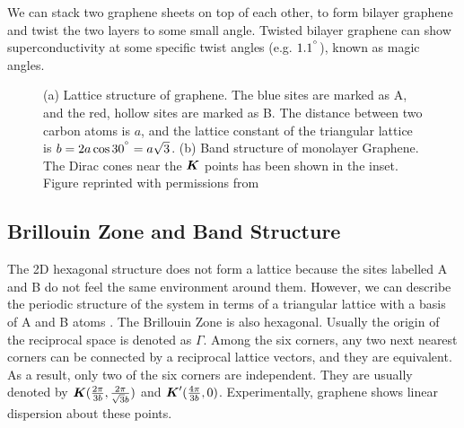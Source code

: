 \documentclass{report}
\renewcommand\vec[1]{\ensuremath\boldsymbol{#1}} %
\begin{document}
We can stack two graphene sheets on top of each other, to form bilayer graphene and twist the two layers to some small angle. Twisted bilayer graphene can show superconductivity \cite{Cao2018TBLSuperconductivity} at some specific twist angles (e.g. $1.1^{\degree}$), known as magic angles.

\begin{figure}[h!]
	\centering
	\caption{(a) Lattice structure of graphene. The blue sites are marked as A, and the red, hollow sites are marked as B. The distance between two carbon atoms is $a$, and the lattice constant of the triangular lattice is $b = 2 a \cos{30^{\degree}} = a\sqrt{3}$. (b) Band structure of monolayer Graphene. The Dirac cones near the $\vec{K}$ points has been shown in the inset. Figure reprinted with permissions from \cite{TheElPropGraphene}}
	\label{fig:GrapheneBandStructure}
\end{figure}

\subsection{Brillouin Zone and Band Structure}
The 2D hexagonal structure does not form a lattice because the sites labelled A and B do not feel the same environment around them. However, we can describe the periodic structure of the system in terms of a triangular lattice with a basis of A and B atoms \cite{book:SimonSolidState}. The Brillouin Zone is also hexagonal. Usually the origin of the reciprocal space is denoted as $\Gamma$. Among the six corners, any two next nearest corners can be connected by a reciprocal lattice vectors, and they are equivalent. As a result, only two of the six corners are independent. They are usually denoted by $\vec{K} (\frac{2\pi}{3b},\frac{2\pi}{\sqrt{3} b})$ and $\vec{K}'(\frac{4\pi}{3b},0)$. Experimentally, graphene shows linear dispersion about these points.
\end{document}
